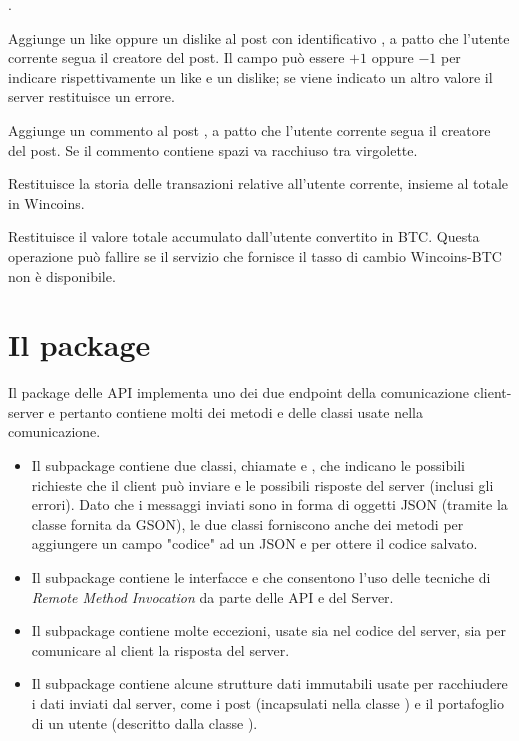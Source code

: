 \documentclass[
    oneside,
    10pt,
    language=italian,
    a4paper,
    article
]{notes}
\begin{document}
\begin{description}
        .
    \item[\mono{rate <idPost> <vote>}] Aggiunge un like oppure un dislike al post
        con identificativo , a patto che l'utente corrente segua
        il creatore del post. Il campo  può essere $+1$ oppure $-1$
        per indicare rispettivamente un like e un dislike; se viene indicato un
        altro valore il server restituisce un errore. 
    \item[\mono{comment <idPost> <contents>}] Aggiunge un commento al post
        , a patto che l'utente corrente segua il creatore del post.
        Se il commento contiene spazi va racchiuso tra virgolette.
    \item[\mono{wallet}] Restituisce la storia delle transazioni relative 
        all'utente corrente, insieme al totale in Wincoins.
    \item[\mono{wallet btc}] Restituisce il valore totale accumulato dall'utente
        convertito in BTC. Questa operazione può fallire se il servizio che
        fornisce il tasso di cambio Wincoins-BTC non è disponibile.   
\end{description}

\section{Il package }
Il package delle API implementa uno dei due endpoint della comunicazione 
client-server e pertanto contiene molti dei metodi e delle classi usate
nella comunicazione. \begin{itemize}
    \item Il subpackage  contiene due classi, chiamate
         e , che indicano le possibili
        richieste che il client può inviare e le possibili risposte del server
        (inclusi gli errori). Dato che i messaggi inviati sono in forma di oggetti
        JSON (tramite la classe  fornita da GSON), le due classi
        forniscono anche dei metodi per aggiungere un campo "codice" ad un JSON
        e per ottere il codice salvato.
    \item Il subpackage  contiene le interfacce
         e  che consentono l'uso
        delle tecniche di \emph{Remote Method Invocation} da parte delle API
        e del Server.
    \item Il subpackage  contiene molte eccezioni,
        usate sia nel codice del server, sia per comunicare al client la risposta
        del server.
    \item Il subpackage  contiene alcune strutture
        dati immutabili usate per racchiudere i dati inviati dal server, come
        i post (incapsulati nella classe ) e il portafoglio di
        un utente (descritto dalla classe ).
\end{itemize}
\end{document}
